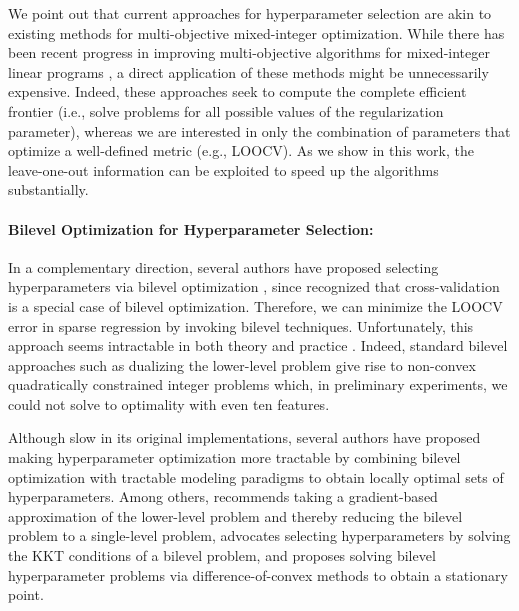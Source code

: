 \documentclass[opre,nonblindrev]{informs3} %
\begin{document}
{We point out that current approaches for hyperparameter selection are akin to existing methods for multi-objective mixed-integer optimization. While there has been recent progress in improving multi-objective algorithms for mixed-integer linear programs \citep{lokman2013finding,stidsen2014branch}, %
a direct application of these methods might be unnecessarily expensive. Indeed, these approaches seek to compute the complete efficient frontier \citep{boland2015criterion,boland2015criterion2} (i.e., solve problems for all possible values of the regularization parameter), whereas we are interested in only the combination of parameters that optimize a well-defined metric (e.g., LOOCV). As we show in this work, the leave-one-out information can be exploited to speed up the algorithms substantially.}



\paragraph{Bilevel Optimization for Hyperparameter Selection:} In a complementary direction, several authors have proposed selecting hyperparameters via bilevel optimization \citep[see][for a general theory]{beck2021gentle}, since \cite{bennett2006model} %
recognized that cross-validation is a special case of bilevel optimization. 
Therefore, we can minimize the LOOCV error in sparse regression by invoking bilevel techniques. Unfortunately, this approach seems intractable in both theory and practice \citep[][]{ben1990computational, hansen1992new}. Indeed, standard bilevel approaches such as dualizing the lower-level problem give rise to non-convex quadratically constrained integer problems which, in preliminary experiments, we could not solve to optimality with even ten features. 

Although slow in its original implementations, several authors have proposed making hyperparameter optimization more tractable by combining bilevel optimization with tractable modeling paradigms to obtain locally optimal sets of hyperparameters. Among others, \cite{sinha2020gradient} recommends taking a gradient-based approximation of the lower-level problem and thereby reducing the bilevel problem to a single-level problem, \cite{okuno2021lp} advocates selecting hyperparameters by solving the KKT conditions of a bilevel problem, and \cite{ye2022difference} proposes solving bilevel hyperparameter problems via difference-of-convex methods to obtain a stationary point.%
\end{document}
